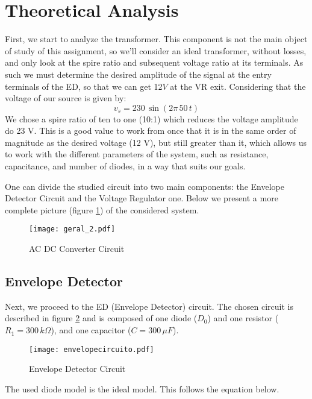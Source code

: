 \section{Theoretical Analysis}
\label{sec:theoretical}

First, we start to analyze the transformer. This component is not the main object of study of this assignment, so we'll consider an ideal transformer, without losses, and only look at the spire ratio and subsequent voltage ratio at its terminals. As such we must determine the desired amplitude of the signal at the entry terminals of the ED, so that we can get 12$V$ at the VR exit.
Considering that the voltage of our source is given by:
\begin{equation*}
v_s=230 \, \sin(2 \pi \, 50 \, t)
\end{equation*}
We chose a spire ratio of ten to one (10:1) which reduces the voltage amplitude do 23 V. This is a good value to work from once that it is in the same order of magnitude as the desired voltage (12 V), but still greater than it, which allows us to work with the different parameters of the system, such as resistance, capacitance, and number of diodes, in a way that suits our goals.

One can divide the studied circuit into two main components: the Envelope Detector Circuit and the Voltage Regulator one. Below we present a more complete picture (figure \ref{fig:circuito}) of the considered system.

\begin{figure}[H]
\centering
\texttt{[image: geral\_2.pdf]}
\caption{AC DC Converter Circuit}
\label{fig:circuito}
\end{figure}


\subsection{Envelope Detector}

Next, we proceed to the ED (Envelope Detector) circuit. The chosen circuit is described in figure \ref{fig:envelopecircuito} and is composed of one diode ($D_0$) and one resistor ($R_1=300\,k\Omega$), and one capacitor ($C=300 \, \mu F$).

\begin{figure}[h!]
\centering
\texttt{[image: envelopecircuito.pdf]}
\caption{Envelope Detector Circuit}
\label{fig:envelopecircuito}
\end{figure}


The used diode model is the ideal model. This follows the equation below.

